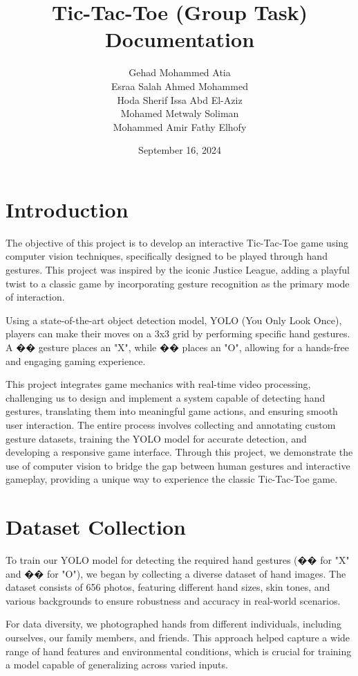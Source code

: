 \documentclass[a4paper,12pt]{article}
\title{Tic-Tac-Toe (Group Task) Documentation}
\author{
    Gehad Mohammed Atia \\
    Esraa Salah Ahmed Mohammed \\
    Hoda Sherif Issa Abd El-Aziz \\
    Mohamed Metwaly Soliman \\
    Mohammed Amir Fathy Elhofy
}
\date{September 16, 2024}
\begin{document}
\maketitle

\tableofcontents
\newpage

\section{Introduction}
The objective of this project is to develop an interactive Tic-Tac-Toe game using computer vision techniques, specifically designed to be played through hand gestures. This project was inspired by the iconic Justice League, adding a playful twist to a classic game by incorporating gesture recognition as the primary mode of interaction.

Using a state-of-the-art object detection model, YOLO (You Only Look Once), players can make their moves on a 3x3 grid by performing specific hand gestures. A �� gesture places an "X", while �� places an "O", allowing for a hands-free and engaging gaming experience.

This project integrates game mechanics with real-time video processing, challenging us to design and implement a system capable of detecting hand gestures, translating them into meaningful game actions, and ensuring smooth user interaction. The entire process involves collecting and annotating custom gesture datasets, training the YOLO model for accurate detection, and developing a responsive game interface. Through this project, we demonstrate the use of computer vision to bridge the gap between human gestures and interactive gameplay, providing a unique way to experience the classic Tic-Tac-Toe game.

\section{Dataset Collection}
To train our YOLO model for detecting the required hand gestures (�� for "X" and �� for "O"), we began by collecting a diverse dataset of hand images. The dataset consists of 656 photos, featuring different hand sizes, skin tones, and various backgrounds to ensure robustness and accuracy in real-world scenarios.

For data diversity, we photographed hands from different individuals, including ourselves, our family members, and friends. This approach helped capture a wide range of hand features and environmental conditions, which is crucial for training a model capable of generalizing across varied inputs.
\end{document}
